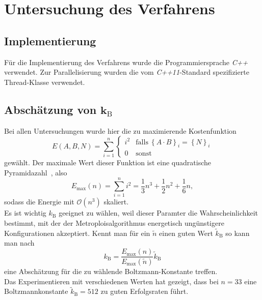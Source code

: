 \chapter{Untersuchung des Verfahrens}

\section{Implementierung}
Für die Implementierung des Verfahrens wurde die Programmiersprache \textit{C++} verwendet. Zur Parallelisierung wurden die vom \textit{C++11}-Standard spezifizierte Thread-Klasse verwendet.

\section{\texorpdfstring{Abschätzung von $\bm{k_\mathrm{B}}$}{Abschätzung von kB}}
Bei allen Untersuchungen wurde hier die zu maximierende Kostenfunktion
\begin{equation*}
		E\left(A,B,N\right)=\sum\limits_{i=1}^n\begin{cases}
    i^2 & \mathrm{falls}\:{\left\{A\cdot B\right\}}_i={\left\{N\right\}}_i \\
	0 & \mathrm{sonst}
  \end{cases}
\end{equation*}
gewählt. Der maximale Wert dieser Funktion ist eine quadratische Pyramidazahl~\parencite{oeis}, also
\begin{equation*}
		E_{\mathrm{max}}\left(n\right)=\sum\limits_{i=1}^n i^2=\frac{1}{3}n^3+\frac{1}{2}n^2+\frac{1}{6}n,
\end{equation*}
sodass die Energie mit $\mathcal{O}\left(n^3\right)$ skaliert. \\
Es ist wichtig $k_\mathrm{B}$ geeignet zu wählen, weil dieser Paramter die Wahrscheinlichkeit bestimmt, mit der der Metroploisalgorithmus energetisch ungünstigere Konfigurationen akzeptiert. Kennt man für ein $\tilde{n}$ einen guten Wert $\tilde{k}_\mathrm{B}$ so kann man nach
\begin{equation*}
		k_\mathrm{B}=\frac{E_{\mathrm{max}}\left(n\right)}{E_{\mathrm{max}}\left(\tilde{n}\right)}\tilde{k}_\mathrm{B}
\end{equation*}
eine Abschätzung für die zu wählende Boltzmann-Konstante treffen. \\
Das Experimentieren mit verschiedenen Werten hat gezeigt, dass bei $n=33$ eine Boltzmannkonstante $\tilde{k}_\mathrm{B}=512$ zu guten Erfolgsraten führt.

